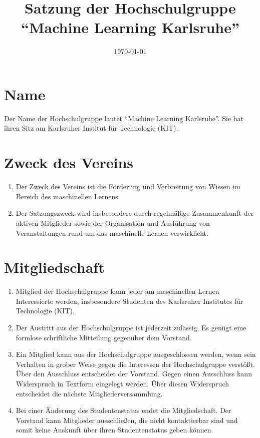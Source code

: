 \documentclass[a4paper]{scrartcl}
\newcommand\GruppenName{Machine Learning Karlsruhe}
\begin{document}
 \author{}
\title{Satzung der Hochschulgruppe \\ \enquote{\GruppenName{}}}
\date{\today}
\maketitle

\section{Name}
Der Name der Hochschulgruppe lautet \enquote{\GruppenName{}}. Sie hat ihren
Sitz am Karlsruher Institut für Technologie (KIT).

\section{Zweck des Vereins}
\begin{enumerate}
    \item Der Zweck des Vereins ist die Förderung und Verbreitung von Wissen
          im Bereich des maschinellen Lernens.
    \item Der Satzungszweck wird insbesondere durch regelmäßige
          Zusammenkunft der aktiven Mitglieder sowie der Organisation und
          Ausführung von Veranstaltungen rund um das maschinelle Lernen
          verwirklicht.
\end{enumerate}

\section{Mitgliedschaft}
\begin{enumerate}
    \item Mitglied der Hochschulgruppe kann jeder am maschinellen Lernen
          Interessierte werden, insbesondere Studenten des Karlsruher
          Institutes für Technologie (KIT).
    \item Der Austritt aus der Hochschulgruppe ist jederzeit zulässig. Es
          genügt eine formlose schriftliche Mitteilung gegenüber dem Vorstand.
    \item Ein Mitglied kann aus der Hochschulgruppe ausgeschlossen werden, wenn
          sein Verhalten in grober Weise gegen die Interessen der
          Hochschulgruppe verstößt. Über den Ausschluss entscheidet der
          Vorstand. Gegen einen Ausschluss kann Widerspruch in Textform
          eingelegt werden. Über diesen Widerspruch entscheidet die nächste
          Mitgliederversammlung.
    \item Bei einer Änderung des Studentenstatus endet die Mitgliedschaft. Der
          Vorstand kann Mitglieder ausschließen, die nicht kontaktierbar sind
          und somit keine Auskunft über ihren Studentenstatus geben können.
\end{enumerate}
\end{document}
